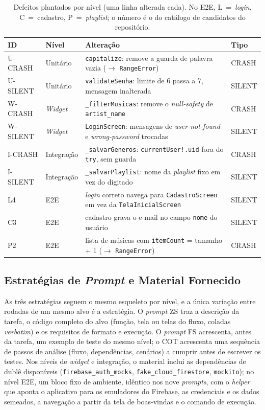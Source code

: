 \documentclass[12pt]{article}
\begin{document}
\begin{table}[H]
\centering
\caption{Defeitos plantados por nível (uma linha alterada cada). No E2E, L~=~\textit{login}, C~=~cadastro, P~=~\textit{playlist}; o número é o do catálogo de candidatos do repositório.}
\label{tab:bugs}
\small
\begin{tabular}{llP{6.2cm}l}
\toprule
\textbf{ID} & \textbf{Nível} & \textbf{Alteração} & \textbf{Tipo} \\
\midrule
U-CRASH  & Unitário   & \texttt{capitalize}: remove a guarda de palavra vazia ($\to$ \texttt{RangeError}) & CRASH \\
U-SILENT & Unitário   & \texttt{validateSenha}: limite de 6 passa a 7, mensagem inalterada & SILENT \\
W-CRASH  & \textit{Widget} & \texttt{\_filterMusicas}: remove o \textit{null-safety} de \texttt{artist\_name} & CRASH \\
W-SILENT & \textit{Widget} & \texttt{LoginScreen}: mensagens de \textit{user-not-found} e \textit{wrong-password} trocadas & SILENT \\
I-CRASH  & Integração & \texttt{\_salvarGeneros}: \texttt{currentUser!.uid} fora do \texttt{try}, sem guarda & CRASH \\
I-SILENT & Integração & \texttt{\_salvarPlaylist}: nome da \textit{playlist} fixo em vez do digitado & SILENT \\
L4       & E2E        & \textit{login} correto navega para \texttt{CadastroScreen} em vez da \texttt{TelaInicialScreen} & SILENT \\
C3       & E2E        & cadastro grava o e-mail no campo \texttt{nome} do usuário & SILENT \\
P2       & E2E        & lista de músicas com \texttt{itemCount} = tamanho + 1 ($\to$ \texttt{RangeError}) & CRASH \\
\bottomrule
\end{tabular}
\end{table}

\subsection{Estratégias de \textit{Prompt} e Material Fornecido}
\label{subsec:estrategias}

As três estratégias seguem o mesmo esqueleto por nível, e a única variação
entre rodadas de um mesmo alvo é a estratégia. O \textit{prompt} ZS traz a
descrição da tarefa, o código completo do alvo (função, tela ou telas do
fluxo, coladas \textit{verbatim}) e os requisitos de formato e execução. O
\textit{prompt} FS acrescenta, antes da tarefa, um exemplo de teste do mesmo
nível; o COT acrescenta uma sequência de passos de análise (fluxo,
dependências, cenários) a cumprir antes de escrever os testes. Nos níveis de
\textit{widget} e integração, o material inclui as dependências de dublê
disponíveis (\texttt{firebase\_auth\_mocks}, \texttt{fake\_cloud\_firestore},
\texttt{mockito}); no nível E2E, um bloco fixo de ambiente, idêntico nos nove
\textit{prompts}, com o \textit{helper} que aponta o aplicativo para os
emuladores do Firebase, as credenciais e os dados semeados, a navegação a
partir da tela de boas-vindas e o comando de execução.
\end{document}
